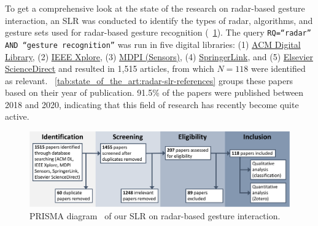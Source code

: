 To get a comprehensive look at the state of the research on radar-based gesture interaction, an SLR was conducted to identify the types of radar, algorithms, and gesture sets used for radar-based gesture recognition (\fig~\ref{fig:state_of_the_art:radar:prisma}). The query \texttt{RQ=``radar'' AND ``gesture recognition''} was run in five digital libraries: (1) \href{https://dl.acm.org/}{ACM Digital Library}, (2) \href{https://ieeexplore.ieee.org/Xplore/home.jsp}{IEEE Xplore}, (3) \href{https://www.mdpi.com/journal/sensors}{MDPI (Sensors)}, (4) \href{https://link.springer.com/}{SpringerLink}, and (5) \href{https://www.sciencedirect.com/}{Elsevier ScienceDirect} and resulted in 1,515 articles, from which $N=118$ were identified as relevant. \tab~\ref{tab:state_of_the_art:radar-slr-references} groups these papers based on their year of publication. 91.5\% of the papers were published between 2018 and 2020, indicating that this field of research has recently become quite active. 

\begin{figure}[hbt]
    \centering
    \includegraphics[width=\linewidth]{Figures/StateOfTheArt/Radar/PRISMA-Radar.pdf}
    \caption{PRISMA diagram~\cite{Page:2021} of our SLR on radar-based gesture interaction.}
    \label{fig:state_of_the_art:radar:prisma}
\end{figure}

